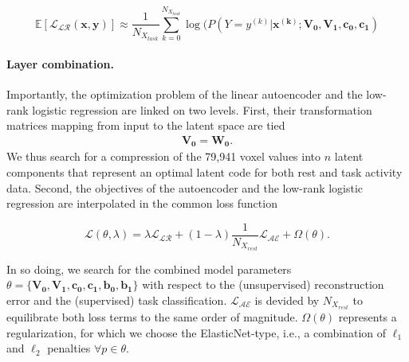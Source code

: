 \documentclass{article} %
\begin{document}
\begin{equation}
    \mathbb E\left[{\mathcal{L_{LR}}}(\mathbf{x, y})\right] \approx %
\frac{1}{N_{X_{task}}} \sum_{k=0}^{N_{X_{task}}} \log(P(Y=y^{(k)}|\mathbf{x^{(k)}; V_0, V_1, c_0, c_1})
\label{eq:lr_loss}
\end{equation}

\paragraph{Layer combination.}
Importantly, the optimization problem of the linear autoencoder
and the low-rank logistic regression
are linked on two levels. First, their transformation matrices mapping from
input to the latent space are tied
\begin{eqnarray}
  \mathbf{V_0} = \mathbf{W_0}.
\end{eqnarray}
We thus search for a compression of the 79,941 voxel values into $n$ latent
components that represent an optimal latent code for both
rest and task activity data.
Second, the objectives of the autoencoder and the low-rank
logistic regression are interpolated in the common loss function

\begin{equation}
{\mathcal{L}}(\theta, \lambda) = \lambda {\mathcal{L_{LR}}}
+ (1-\lambda)\frac{1}{N_{X_{rest}}} {\mathcal{L_{AE}}} + \Omega(\theta).
  \label{eq:loss_equ}
\end{equation}

In so doing, we search for the combined model parameters
$\theta=\{\mathbf{V_0,V_1,c_0, c_1, b_0, b_1}\}$
with respect to the (unsupervised) reconstruction error and the
(supervised) task classification.
${\mathcal{L_{AE}}}$ is devided by ${N_{X_{rest}}}$ to equilibrate both
loss terms to the same order of magnitude.
\(\Omega(\theta)\) represents a regularization, for which we choose the
ElasticNet-type, i.e., a combination of $\ell_1$ and $\ell_2$ penalties
$\forall p \in \theta$.

\end{document}
